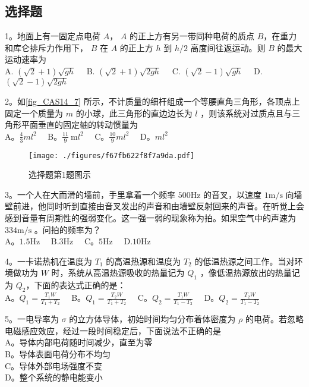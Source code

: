 
\subsection{选择题}
1。地面上有一固定点电荷 $A$， $A$ 的正上方有另一带同种电荷的质点 $B$，在重力和库仑排斥力作用下， $B$ 在 $A$ 的正上方 $h$ 到 $h/2$ 高度间往返运动。则 $B$ 的最大运动速率为\\
A. $(\sqrt{2}+1) \sqrt{g h}\quad$
B. $(\sqrt{2}+1) \sqrt{2 g h}\quad$
C. $(\sqrt{2}-1) \sqrt{g h}\quad$
D. $(\sqrt{2}-1) \sqrt{2 g h}$

2。如\autoref{fig_CAS14_7} 所示，不计质量的细杆组成一个等腰直角三角形，各顶点上固定一个质量为 $m$ 的小球，此三角形的直边边长为 $l$ ，则该系统对过质点且与三角形平面垂直的固定轴的转动惯量为\\
A。$\frac{4}{3} m l^{2}\quad$
B。$\frac{11}{9} \mathrm{~m} l^{2}\quad$
C。$\frac{10}{9} m l^{2}\quad$
D。$ml^{2}$
\begin{figure}[ht]
\centering
\texttt{[image: ./figures/f67fb622f8f7a9da.pdf]}
\caption{选择题第1题图示} \label{fig_CAS14_7}
\end{figure}
3。一个人在大而滑的墙前，手里拿着一个频率 $500\mathrm{Hz}$ 的音叉，以速度 $1\mathrm{m/s}$ 向墙壁前进，他同时听到直接由音叉发出的声音和由墙壁反射回来的声音。在听觉上会感到音量有周期性的强弱变化。这一强一弱的现象称为拍。如果空气中的声速为 $334\mathrm{m/s}$ 。问拍的频率为？\\
A。$1.5\mathrm{Hz}\quad$ B.$3\mathrm{Hz}\quad$ C。$5\mathrm{Hz}\quad$ D.$10\mathrm{Hz}$

4。一卡诺热机在温度为 $T_1$ 的高温热源和温度为 $T_2$ 的低温热源之间工作。当对环境做功为 $W$ 时，系统从高温热源吸收的热量记为 $Q_1$ ，像低温热源放出的热量记为 $Q_2$，下面的表达式正确的是：\\

A。$Q_1=\frac{T_1W}{T_1+T_2}\quad$ B。$Q_1=\frac{T_2W}{T_1+T_2}\quad$ C。$Q_2=\frac{T_1W}{T_1-T_2}\quad$ D。$Q_2=\frac{T_2W}{T_1-T_2}$

5。一电导率为 $\sigma$ 的立方体导体，初始时间均匀分布着体密度为 $\rho$ 的电荷。若忽略电磁感应效应，经过一段时间稳定后，下面说法不正确的是\\
A。导体内部电荷随时间减少，直至为零\\
B。导体表面电荷分布不均匀\\
C。导体外部电场强度不变\\
D。整个系统的静电能变小

